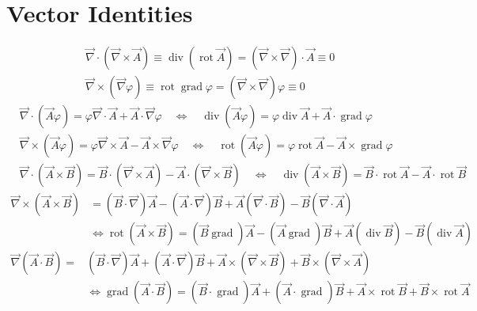 \section{Vector Identities}
\begin{equation}
\begin{aligned}
&\vec{\nabla} \cdot(\vec{\nabla} \times \vec{A}) \equiv \operatorname{div}(\operatorname{rot} \vec{A})=(\vec{\nabla} \times \vec{\nabla}) \cdot \vec{A} \equiv 0\\
&\vec{\nabla} \times(\vec{\nabla} \varphi) \equiv \operatorname{rot} \operatorname{grad} \varphi=(\vec{\nabla} \times \vec{\nabla}) \varphi \equiv 0
\end{aligned}
\end{equation}
\begin{equation}
\begin{aligned}
&\vec{\nabla} \cdot(\vec{A} \varphi)=\varphi \vec{\nabla} \cdot \vec{A}+\vec{A} \cdot \vec{\nabla} \varphi \quad \Longleftrightarrow \quad \operatorname{div}(\vec{A} \varphi)=\varphi \operatorname{div} \vec{A}+\vec{A} \cdot \operatorname{grad} \varphi\\
&\vec{\nabla} \times(\vec{A} \varphi)=\varphi \vec{\nabla} \times \vec{A}-\vec{A} \times \vec{\nabla} \varphi \quad \Longleftrightarrow \quad \operatorname{rot}(\vec{A} \varphi)=\varphi \operatorname{rot} \vec{A}-\vec{A} \times \operatorname{grad} \varphi\\
&\vec{\nabla} \cdot(\vec{A} \times \vec{B})=\vec{B} \cdot(\vec{\nabla} \times \vec{A})-\vec{A} \cdot(\vec{\nabla} \times \vec{B}) \quad \Longleftrightarrow \quad \operatorname{div}(\vec{A} \times \vec{B})=\vec{B} \cdot \operatorname{rot} \vec{A}-\vec{A} \cdot \operatorname{rot} \vec{B}
\end{aligned}
\end{equation}
\begin{equation}
\begin{aligned}
\vec{\nabla} \times(\vec{A} \times \vec{B}) &=(\vec{B} \cdot \vec{\nabla}) \vec{A}-(\vec{A} \cdot \vec{\nabla}) \vec{B}+\vec{A}(\vec{\nabla} \cdot \vec{B})-\vec{B}(\vec{\nabla} \cdot \vec{A}) \\
& \Longleftrightarrow \operatorname{rot}(\vec{A} \times \vec{B})=(\vec{B} \operatorname{grad}) \vec{A}-(\vec{A} \operatorname{grad}) \vec{B}+\vec{A}(\operatorname{div} \vec{B})-\vec{B}(\operatorname{div} \vec{A})
\end{aligned}
\end{equation}
\begin{equation}
\begin{aligned}
\vec{\nabla}(\vec{A} \cdot \vec{B})=&(\vec{B} \cdot \vec{\nabla}) \vec{A}+(\vec{A} \cdot \vec{\nabla}) \vec{B}+\vec{A} \times(\vec{\nabla} \times \vec{B})+\vec{B} \times(\vec{\nabla} \times \vec{A}) \\
& \Longleftrightarrow \operatorname{grad}(\vec{A} \cdot \vec{B})=(\vec{B} \cdot \operatorname{grad}) \vec{A}+(\vec{A} \cdot \operatorname{grad}) \vec{B}+\vec{A} \times \operatorname{rot} \vec{B}+\vec{B} \times \operatorname{rot} \vec{A}
\end{aligned}
\end{equation}
